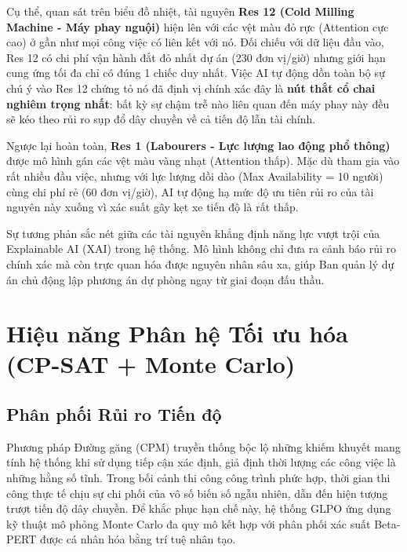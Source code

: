Cụ thể, quan sát trên biểu đồ nhiệt, tài nguyên \textbf{Res 12 (Cold Milling Machine - Máy phay nguội)} hiện lên với các vệt màu đỏ rực (Attention cực cao) ở gần như mọi công việc có liên kết với nó. Đối chiếu với dữ liệu đầu vào, Res 12 có chi phí vận hành đắt đỏ nhất dự án (230 đơn vị/giờ) nhưng giới hạn cung ứng tối đa chỉ có đúng 1 chiếc duy nhất. Việc AI tự động dồn toàn bộ sự chú ý vào Res 12 chứng tỏ nó đã định vị chính xác đây là \textbf{nút thắt cổ chai nghiêm trọng nhất}: bất kỳ sự chậm trễ nào liên quan đến máy phay này đều sẽ kéo theo rủi ro sụp đổ dây chuyền về cả tiến độ lẫn tài chính.

Ngược lại hoàn toàn, \textbf{Res 1 (Labourers - Lực lượng lao động phổ thông)} được mô hình gán các vệt màu vàng nhạt (Attention thấp). Mặc dù tham gia vào rất nhiều đầu việc, nhưng với lực lượng dồi dào (Max Availability = 10 người) cùng chi phí rẻ (60 đơn vị/giờ), AI tự động hạ mức độ ưu tiên rủi ro của tài nguyên này xuống vì xác suất gây kẹt xe tiến độ là rất thấp.

Sự tương phản sắc nét giữa các tài nguyên khẳng định năng lực vượt trội của Explainable AI (XAI) trong hệ thống. Mô hình không chỉ đưa ra cảnh báo rủi ro chính xác mà còn trực quan hóa được nguyên nhân sâu xa, giúp Ban quản lý dự án chủ động lập phương án dự phòng ngay từ giai đoạn đấu thầu.

\section{Hiệu năng Phân hệ Tối ưu hóa (CP-SAT + Monte Carlo)}
\label{sec:3.4_hieu_nang_toi_uu_hoa}

\subsection{Phân phối Rủi ro Tiến độ}
\label{sec:3.4.1_monte_carlo}

Phương pháp Đường găng (CPM) truyền thống bộc lộ những khiếm khuyết mang tính hệ thống khi sử dụng tiếp cận xác định, giả định thời lượng các công việc là những hằng số tĩnh. Trong bối cảnh thi công công trình phức hợp, thời gian thi công thực tế chịu sự chi phối của vô số biến số ngẫu nhiên, dẫn đến hiện tượng trượt tiến độ dây chuyền. Để khắc phục hạn chế này, hệ thống GLPO ứng dụng kỹ thuật mô phỏng Monte Carlo đa quy mô kết hợp với phân phối xác suất Beta-PERT được cá nhân hóa bằng trí tuệ nhân tạo.

